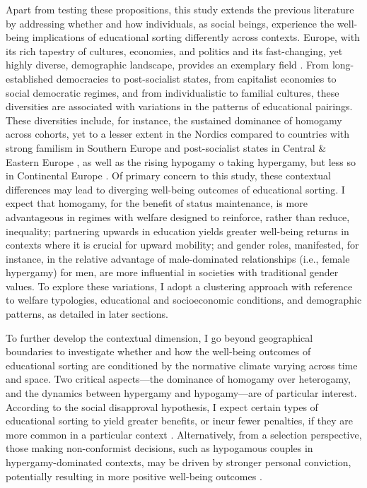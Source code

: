 Apart from testing these propositions, this study extends the previous literature by addressing whether and how individuals, as social beings, experience the well-being implications of educational sorting differently across contexts. Europe, with its rich tapestry of cultures, economies, and politics and its fast-changing, yet highly diverse, demographic landscape, provides an exemplary field \parencite{artsModelsWelfareState2010,dehauwReversedGenderGap2017,eratEducationalAssortativeMating2021,esping-andersenThreeWorldsWelfare1990,esping-andersenWelfareRegimesSocial2015}. From long-established democracies to post-socialist states, from capitalist economies to social democratic regimes, and from individualistic to familial cultures, these diversities are associated with variations in the patterns of educational pairings. These diversities include, for instance, the sustained dominance of homogamy across cohorts, yet to a lesser extent in the Nordics compared to countries with strong familism in Southern Europe and post-socialist states in Central \& Eastern Europe \parencite{domanskiEducationalHomogamy222007}, as well as the rising hypogamy o taking hypergamy, but less so in Continental Europe \parencite{dehauwReversedGenderGap2017,eratEducationalAssortativeMating2021}. Of primary concern to this study, these contextual differences may lead to diverging well-being outcomes of educational sorting. I expect that homogamy, for the benefit of status maintenance, is more advantageous in regimes with welfare designed to reinforce, rather than reduce, inequality; partnering upwards in education yields greater well-being returns in contexts where it is crucial for upward mobility; and gender roles, manifested, for instance, in the relative advantage of male-dominated relationships (i.e., female hypergamy) for men, are more influential in societies with traditional gender values. To explore these variations, I adopt a clustering approach with reference to welfare typologies, educational and socioeconomic conditions, and demographic patterns, as detailed in later sections.

To further develop the contextual dimension, I go beyond geographical boundaries to investigate whether and how the well-being outcomes of educational sorting are conditioned by the normative climate varying across time and space. Two critical aspects—the dominance of homogamy over heterogamy, and the dynamics between hypergamy and hypogamy—are of particular interest. According to the social disapproval hypothesis, I expect certain types of educational sorting to yield greater benefits, or incur fewer penalties, if they are more common in a particular context \parencite{kalmijnCountryDifferencesEffects2010,soonsMarriageMoreCohabitation2009}. Alternatively, from a selection perspective, those making non-conformist decisions, such as hypogamous couples in hypergamy-dominated contexts, may be driven by stronger personal conviction, potentially resulting in more positive well-being outcomes \parencite{potarcaAreWomenHypogamous2022}.

